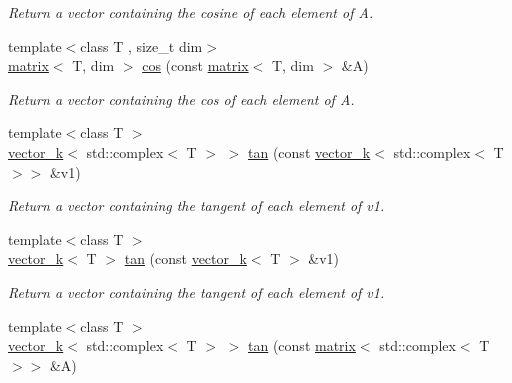 \begin{DoxyCompactItemize}
\begin{DoxyCompactList}\small\item\em Return a vector containing the cosine of each element of A. \end{DoxyCompactList}\item 
\hypertarget{namespacekeycpp_a882ae0fcbeee4b61db0483546cf76021}{{\footnotesize template$<$class T , size\-\_\-t dim$>$ }\\\hyperlink{classkeycpp_1_1matrix}{matrix}$<$ T, dim $>$ \hyperlink{namespacekeycpp_a882ae0fcbeee4b61db0483546cf76021}{cos} (const \hyperlink{classkeycpp_1_1matrix}{matrix}$<$ T, dim $>$ \&A)}\label{namespacekeycpp_a882ae0fcbeee4b61db0483546cf76021}

\begin{DoxyCompactList}\small\item\em Return a vector containing the cos of each element of A. \end{DoxyCompactList}\item 
\hypertarget{namespacekeycpp_a25563b8ed483cdd3bbbaf647beb76ba8}{{\footnotesize template$<$class T $>$ }\\\hyperlink{classkeycpp_1_1vector__k}{vector\-\_\-k}$<$ std\-::complex$<$ T $>$ $>$ \hyperlink{namespacekeycpp_a25563b8ed483cdd3bbbaf647beb76ba8}{tan} (const \hyperlink{classkeycpp_1_1vector__k}{vector\-\_\-k}$<$ std\-::complex$<$ T $>$$>$ \&v1)}\label{namespacekeycpp_a25563b8ed483cdd3bbbaf647beb76ba8}

\begin{DoxyCompactList}\small\item\em Return a vector containing the tangent of each element of v1. \end{DoxyCompactList}\item 
\hypertarget{namespacekeycpp_a90f340395d16b059204d507250945f35}{{\footnotesize template$<$class T $>$ }\\\hyperlink{classkeycpp_1_1vector__k}{vector\-\_\-k}$<$ T $>$ \hyperlink{namespacekeycpp_a90f340395d16b059204d507250945f35}{tan} (const \hyperlink{classkeycpp_1_1vector__k}{vector\-\_\-k}$<$ T $>$ \&v1)}\label{namespacekeycpp_a90f340395d16b059204d507250945f35}

\begin{DoxyCompactList}\small\item\em Return a vector containing the tangent of each element of v1. \end{DoxyCompactList}\item 
\hypertarget{namespacekeycpp_abae345d963258d8db3de7630a21f7231}{{\footnotesize template$<$class T $>$ }\\\hyperlink{classkeycpp_1_1vector__k}{vector\-\_\-k}$<$ std\-::complex$<$ T $>$ $>$ \hyperlink{namespacekeycpp_abae345d963258d8db3de7630a21f7231}{tan} (const \hyperlink{classkeycpp_1_1matrix}{matrix}$<$ std\-::complex$<$ T $>$$>$ \&A)}\label{namespacekeycpp_abae345d963258d8db3de7630a21f7231}


\end{DoxyCompactItemize}
